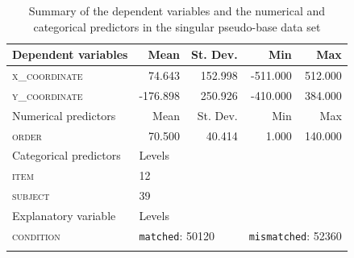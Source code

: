 \begin{table}\fontsize{10}{11}
\caption{Summary of the dependent variables and the numerical and categorical predictors in the singular pseudo-base data set}
\label{tab:7.9}
\centering
\begin{tabular}{lrrrr} 
\lsptoprule
Dependent variables    & Mean     & St. Dev.                  & Min      & Max                           \\ 
\midrule
\textsc{x\_coordinate}          & 74.643   & 152.998                   & -511.000 & 512.000                       \\
\textsc{y\_coordinate}          & -176.898 & 250.926                   & -410.000 & 384.000                       \\ 
\midrule
Numerical predictors   & Mean     & St. Dev.                  & Min      & Max                           \\ 
\midrule
\textsc{order}                  & 70.500   & 40.414                    & 1.000    & 140.000                       \\ 
\midrule
Categorical predictors & \multicolumn{1}{l}{Levels}   & ~                         & ~        & ~                             \\ 
\midrule
\textsc{item}                   & \multicolumn{1}{l}{12}       & ~                         & ~        & ~                             \\
\textsc{subject}                & \multicolumn{1}{l}{39}       & ~                         & ~        & ~                             \\ 
\midrule
Explanatory variable   & \multicolumn{1}{l}{Levels}   & ~                         & ~        & ~                             \\ 
\midrule
\textsc{condition}              & \multicolumn{2}{l}{\texttt{matched}:
  50120} & \multicolumn{2}{l}{\texttt{mismatched}:
  52360}  \\
\lspbottomrule
\end{tabular}
\end{table}






